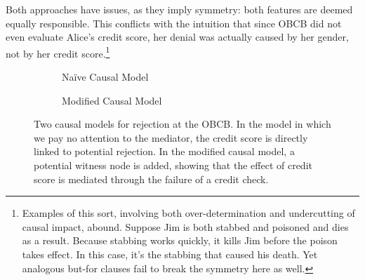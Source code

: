 \documentclass[anon,12pt]{clear2025} %
\begin{document}
Both approaches have issues, as they imply symmetry: both features are deemed equally responsible. This conflicts with the intuition that since OBCB did not even evaluate Alice’s credit score, her denial was actually caused by her gender, not by her credit score.\footnote{Examples of this sort, involving both over-determination and undercutting of causal impact, abound. Suppose Jim is both stabbed and poisoned and dies as a result. Because stabbing works quickly, it kills Jim before the poison takes effect. In this case, it’s the stabbing that caused his death. Yet analogous but-for clauses fail to break the symmetry here as well.}

\vspace{2mm}


\begin{figure} 
    \centering
    \hspace{-1cm}
    \begin{subfigure}[t]{0.42\textwidth}
    \centering
        \caption{Na\"ive Causal Model}
    \end{subfigure}
    \begin{subfigure}[t]{0.46\textwidth}
    \centering
        \caption{Modified Causal Model}
    \end{subfigure}
    \caption{Two causal models for rejection at the OBCB. In the model in which we pay no attention to the mediator, the credit score is directly linked to potential rejection. In the modified causal model, a potential witness node is added, showing that the effect of credit score is mediated through the failure of a credit check.}
    \label{fig:obcb_causal_models}
\end{figure}
\end{document}

